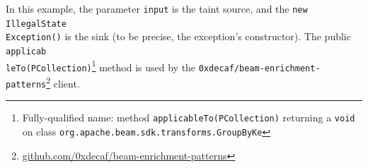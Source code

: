




In this example, the parameter \texttt{input} is the taint source, and the \texttt{new IllegalState\\Exception()} is the sink (to be precise, the exception's constructor). The public \texttt{applicab\\leTo(PCollection)}\footnote{Fully-qualified name: method \texttt{applicableTo(PCollection)} returning a \texttt{void} on class \texttt{org.apache.beam.sdk.transforms.GroupByKe}} method is used by the \texttt{0xdecaf/beam-enrichment-patterns}\footnote{\url{github.com/0xdecaf/beam-enrichment-patterns}} client.


